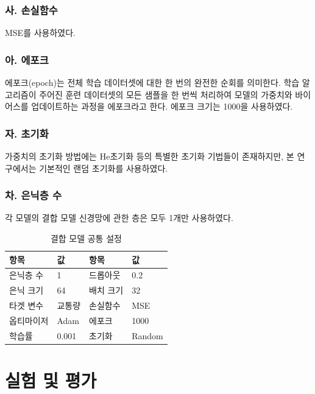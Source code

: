\documentclass[11pt]{report}
\begin{document}
\subsubsection*{사. 손실함수}
MSE를 사용하였다. 
\subsubsection*{아. 에포크}
에포크(epoch)는 전체 학습 데이터셋에 대한 한 번의 완전한 순회를 의미한다. 
학습 알고리즘이 주어진 훈련 데이터셋의 모든 샘플을 한 번씩 처리하여 모델의 가중치와 바이어스를 업데이트하는 과정을 에포크라고 한다. 
에포크 크기는 1000을 사용하였다. 
\subsubsection*{자. 초기화}
가중치의 초기화 방법에는 He초기화 등의 특별한 초기화 기법들이 존재하지만, 본 연구에서는 기본적인 랜덤 초기화를 사용하였다. 
\subsubsection*{차. 은닉층 수}
각 모델의 결합 모델 신경망에 관한 층은 모두 1개만 사용하였다. 

\begin{table}[H]
	\begin{center}
	\vspace{0.5cm}
	\begin{tabular}{|l|l|l|l|}
		\hline
		\rowcolor[HTML]{C0C0C0} 
		항목    & 값     & 항목    & 값      \\ \hline
		은닉층 수 & 1     & 드롭아웃  & 0.2    \\ \hline
		은닉 크기 & 64    & 배치 크기 & 32     \\ \hline
		타겟 변수 & 교통량   & 손실함수  & MSE    \\ \hline
		옵티마이저 & Adam  & 에포크   & 1000    \\ \hline
		학습률   & 0.001 & 초기화   & Random \\ \hline
	\end{tabular}
	\end{center}
	\caption{결합 모델 공통 설정}
	\label{tab:pub_set}
\end{table}

\section{실험 및 평가}
\end{document}
